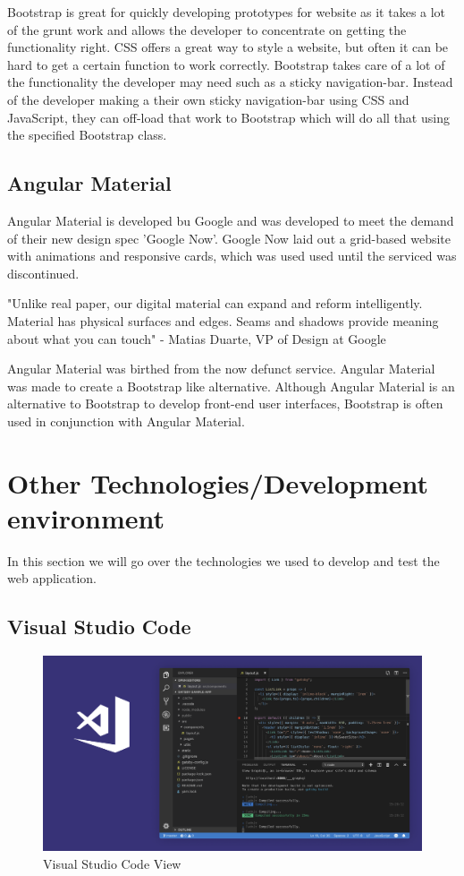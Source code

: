 Bootstrap is great for quickly developing prototypes for website as it takes a lot of the grunt work and allows the developer to concentrate on getting the functionality right. CSS offers a great way to style a website, but often it can be hard to get a certain function to work correctly. Bootstrap takes care of a lot of the functionality the developer may need such as a sticky navigation-bar. Instead of the developer making a their own sticky navigation-bar using CSS and JavaScript, they can off-load that work to Bootstrap which will do all that using the specified Bootstrap class.

\subsection{Angular Material}
Angular Material is developed bu Google and was developed to meet the demand of their new design spec 'Google Now'. Google Now laid out a grid-based website with animations and responsive cards, which was used used until the serviced was discontinued.

\begin{displayquote}
"Unlike real paper, our digital material can expand and reform intelligently. Material has physical surfaces and edges. Seams and shadows provide meaning about what you can touch" - Matias Duarte, VP of Design at Google
\end{displayquote}

Angular Material was birthed from the now defunct service. Angular Material was made to create a Bootstrap like alternative. Although Angular Material is an alternative to Bootstrap to develop front-end user interfaces, Bootstrap is often used in conjunction with Angular Material.

\section{Other Technologies/Development environment}
In this section we will go over the technologies we used to develop and test the web application.

\subsection{Visual Studio Code}
\begin{figure}[H]
  \includegraphics[width=\linewidth]{img/opengraph-home.png}
  \caption{Visual Studio Code View}
  \label{fig:VSC}
\end{figure}

